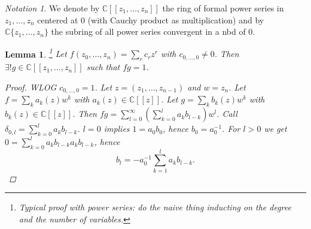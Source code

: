 \documentclass[12pt]{article}
\theoremstyle{darkgreentheorem}
\newtheorem{lm}[thm]{Lemma}
\theoremstyle{darkbluedefinition}
\theoremstyle{darkredexample}
\theoremstyle{remark}
\newtheorem{nota}[thm]{Notation}
\newcommand{\1}{\mathbbm{1}}
\newcommand{\C}{\mathbb{C}}
\begin{document}
\begin{nota}
    We denote by $\C[[z_{1},\ldots,z_{n}]]$ the ring of formal power series in $z_{1},\ldots,z_{n}$ centered at $0$ (with Cauchy product as multiplication) and by $\C\{z_{1},\ldots,z_{n}\}$ the subring of all power series convergent in a nbd of $0$.
\end{nota}

\begin{lm}\footnote{Typical proof with power series: do the naive thing inducting on the degree and the number of variables.}
    Let $f(z_{0},\ldots,z_{n})=\sum_{r} c_{r}z^{r}$ with $c_{0,\ldots, 0}\neq 0$.
    Then $\exists !g\in \C[[z_{1},\ldots,z_{n}]]$ such that $fg=1$.
    \begin{proof}
	WLOG $c_{0,\ldots, 0}=1$.
	Let $z=(z_{1},\ldots,z_{n-1})$ and $w=z_{n}$.
	Let $f=\sum_{k}a_{k}(z)w^{k}$ with $a_{k}(z)\in \C[[z]]$.
	Let $g=\sum_{k} b_{k}(z)w^{k}$ with $b_{k}(z)\in \C[[z]]$.
	Then $fg=\sum_{l=0}^{\infty}(\sum_{k=0}^{l}a_{k}b_{l-k})w^{l}$.
	Call $\delta_{0,l}=\sum_{k=0}^{l}a_{k}b_{l-k}$.
	$l=0$ implies $1=a_{0}b_{0}$, hence $b_{0}=a_{0}^{-1}$.
	For $l>0$ we get $0=\sum_{k=0}^{l}a_{k}b_{l-k}a_{k}b_{l-k}$, hence
	\[b_{l}=-a_{0}^{-1}\sum_{k=1}^{l}a_{k}b_{l-k}.\]
    \end{proof}
\end{lm}
\end{document}
